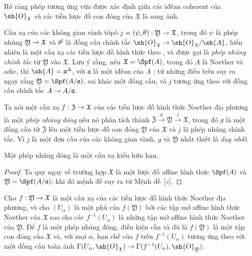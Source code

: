 \documentclass[oneside]{amsart}
\makeatletter
\newcommand{\ega@arrow}[2]{\mathchoice{#1}{#2}{#2}{#2}}
\renewcommand{\to}{\ega@arrow{\longrightarrow}{\rightarrow}}
\let\EGAOriginalLabel\label
\renewcommand{\label}[1]{\phantomsection\EGAOriginalLabel{#1}}
\newcommand*{\ega@errmark}[1]{\textbf{Err}\textsubscript{#1}}
\newcommand{\erratum}[2][]{{#2}\marginpar{\footnotesize\ega@errmark{#1}}}
\makeatother
\begin{document}
Rõ ràng phép tương ứng vừa được xác định giữa các \erratum[II]{iđêan coherent của $\sh{O}_\mathfrak{X}$} và các tiền lược đồ con đóng của $\mathfrak{X}$ là song ánh.

Cấu xạ của các không gian vành tôpô $j=(\psi,\theta):\mathfrak{Y}\to\mathfrak{X}$, trong đó $\psi$ là phép nhúng $\mathfrak{Y}\to\mathfrak{X}$ và $\theta^\sharp$ là đồng cấu chính tắc $\sh{O}_\mathfrak{X}\to\sh{O}_\mathfrak{X}/\sh{A}$, hiển nhiên là một cấu xạ các tiền lược đồ hình thức theo , và được gọi là \emph{phép nhúng chính tắc} từ $\mathfrak{Y}$ vào $\mathfrak{X}$.
Lưu ý rằng, nếu $\mathfrak{X}=\Spf(A)$, trong đó $A$ là Noether và adic, thì $\sh{A}=\mathfrak{a}^\Delta$, với $\mathfrak{a}$ là một iđêan của $A$ ; từ những điều trên suy ra ngay rằng $\mathfrak{Y}=\Spf(A/\mathfrak{a})$, sai khác một đẳng cấu, và $j$ tương ứng theo  với đồng cấu chính tắc $A\to A/\mathfrak{a}$.

Ta nói một cấu xạ $f:\mathfrak{Z}\to\mathfrak{X}$ của các tiền lược đồ hình thức Noether địa phương là một \emph{phép nhúng đóng} nếu nó phân tích thành $\mathfrak{Z}\xrightarrow{g}\mathfrak{Y}\xrightarrow{j}\mathfrak{X}$, trong đó $g$ là một đẳng cấu từ $\mathfrak{Z}$ lên một tiền lược đồ con đóng $\mathfrak{Y}$ của $\mathfrak{X}$ và $j$ là phép nhúng chính tắc.
Vì $j$ là một đơn cấu của các không gian vành, $g$ và $\mathfrak{Y}$ nhất thiết là \emph{duy nhất}.

\begin{proposition}[10.14.3]
\label{I.10.14.3}
Một phép nhúng đóng là một cấu xạ kiểu hữu hạn.
\end{proposition}

\begin{proof}
Ta quy ngay về trường hợp $\mathfrak{X}$ là một lược đồ affine hình thức $\Spf(A)$ và $\mathfrak{Y}=\Spf(A/\mathfrak{a})$;
khi đó mệnh đề suy ra từ Mệnh đề~[\emph{c}].
\end{proof}

\begin{lemma}[10.14.4]
\label{I.10.14.4}
Cho $f:\mathfrak{Y}\to\mathfrak{X}$ là một cấu xạ của các tiền lược đồ hình thức Noether địa phương, và cho $(U_\alpha)$ là một phủ của $f(\mathfrak{Y})$ bởi các tập mở affine hình thức Noether của $\mathfrak{X}$ sao cho các $f^{-1}(U_\alpha)$ là những tập mở affine hình thức Noether của $\mathfrak{Y}$.
Để $f$ là một phép nhúng đóng, điều kiện cần và đủ là $f(\mathfrak{Y})$ là một tập con đóng của $\mathfrak{X}$ và, với mọi $\alpha$, hạn chế của $f$ trên $f^{-1}(U_\alpha)$ tương ứng theo  với một đồng cấu toàn ánh $\Gamma(U_\alpha,\sh{O}_\mathfrak{X})\to\Gamma(f^{-1}(U_\alpha),\sh{O}_\mathfrak{Y})$.
\end{lemma}
\end{document}
